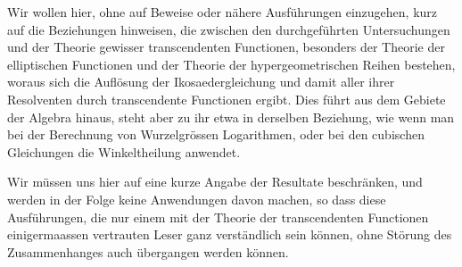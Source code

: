 \documentclass[11pt]{article}
\begin{document}
Wir wollen hier, ohne auf Beweise oder nähere Ausführungen einzugehen, kurz auf die Beziehungen hinweisen, die zwischen den durchgeführten Untersuchungen und der Theorie gewisser transcendenten Functionen, besonders der Theorie der elliptischen Functionen und der Theorie der hypergeometrischen Reihen bestehen, woraus sich die Auflösung der Ikosaedergleichung und damit aller ihrer Resolventen durch transcendente Functionen ergibt. Dies führt aus dem Gebiete der Algebra hinaus, steht aber zu ihr etwa in derselben Beziehung, wie wenn man bei der Berechnung von Wurzelgrössen Logarithmen, oder bei den cubischen Gleichungen die Winkeltheilung anwendet.

Wir müssen uns hier auf eine kurze Angabe der Resultate beschränken, und werden in der Folge keine Anwendungen davon machen, so dass diese Ausführungen, die nur einem mit der Theorie der transcendenten Functionen einigermaassen vertrauten Leser ganz verständlich sein können, ohne Störung des Zusammenhanges auch übergangen werden können.
\end{document}

